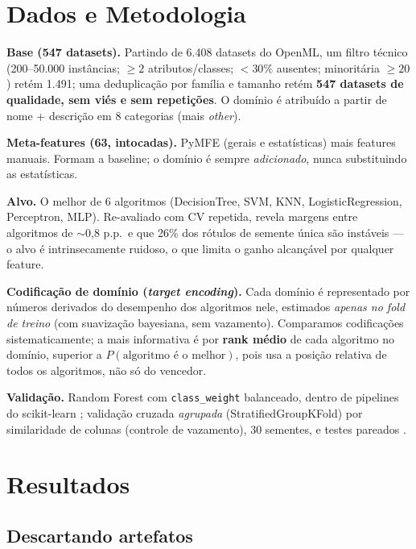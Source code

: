 \documentclass[12pt]{article}
\begin{document}
\section{Dados e Metodologia}

\textbf{Base (547 datasets).} Partindo de 6.408 datasets do OpenML, um filtro
técnico (200--50.000 instâncias; $\geq 2$ atributos/classes; $<30\%$ ausentes;
minoritária $\geq 20$) retém 1.491; uma deduplicação por família e tamanho retém
\textbf{547 datasets de qualidade, sem viés e sem repetições}. O domínio é
atribuído a partir de nome + descrição em 8 categorias (mais \textit{other}).

\textbf{Meta-features (63, intocadas).} PyMFE \cite{alcobaca2020mfe} (gerais e
estatísticas) mais features manuais. Formam a baseline; o domínio é sempre
\emph{adicionado}, nunca substituindo as estatísticas.

\textbf{Alvo.} O melhor de 6 algoritmos (DecisionTree, SVM, KNN, LogisticRegression,
Perceptron, MLP). Re-avaliado com CV repetida, revela margens entre algoritmos de
$\sim$0,8 p.p.\ e que 26\% dos rótulos de semente única são instáveis --- o alvo é
intrinsecamente ruidoso, o que limita o ganho alcançável por qualquer feature.

\textbf{Codificação de domínio (\textit{target encoding}).} Cada domínio é
representado por números derivados do desempenho dos algoritmos nele, estimados
\emph{apenas no fold de treino} (com suavização bayesiana, sem vazamento).
Comparamos codificações sistematicamente; a mais informativa é por \textbf{rank
médio} de cada algoritmo no domínio, superior a $P(\text{algoritmo é o melhor})$,
pois usa a posição relativa de todos os algoritmos, não só do vencedor.

\textbf{Validação.} Random Forest \cite{breiman2001random} com
\texttt{class\_weight} balanceado, dentro de pipelines do scikit-learn
\cite{pedregosa2011scikit}; validação cruzada \emph{agrupada}
(StratifiedGroupKFold) por similaridade de colunas (controle de vazamento), 30
sementes, e testes pareados \cite{demsar2006statistical}.

\section{Resultados}

\subsection{Descartando artefatos}
\end{document}
